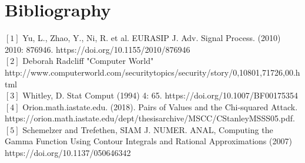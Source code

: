 \documentclass[12pt]{article}
\begin{document}
\section{Bibliography}
$[1]$ Yu, L., Zhao, Y., Ni, R. et al. EURASIP J. Adv. Signal Process. (2010) 2010: 876946. https://doi.org/10.1155/2010/876946 \\
$[2]$ Deborah Radcliff "Computer World" http://www.computerworld.com/securitytopics/security/story/0,10801,71726,00.html \\
$[3]$ Whitley, D. Stat Comput (1994) 4: 65. https://doi.org/10.1007/BF00175354 \\
$[4]$ Orion.math.iastate.edu. (2018). Pairs of Values and the Chi-squared Attack. https://orion.math.iastate.edu/dept/thesisarchive/MSCC/CStanleyMSSS05.pdf. \\
$[5]$ Schemelzer and Trefethen, SIAM J. NUMER. ANAL, Computing the Gamma Function Using Contour Integrals and Rational Approximations (2007) https://doi.org/10.1137/050646342
\end{document}
